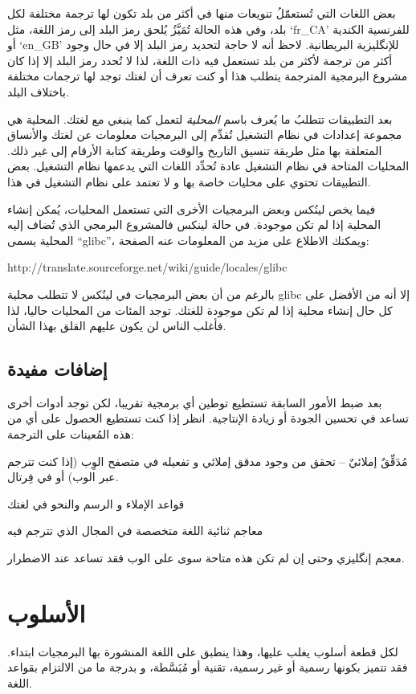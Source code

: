 بعض اللغات التي تُستعمّلُ تنويعات منها في أكثر من بلد تكون لها ترجمة
مختلفة لكل بلد، وفي هذه الحالة تُمَيَّزُ يُلحق رمز البلد إلى رمز اللغة،
مثل ‘fr\_CA’ للفرنسية الكندية أو ‘en\_GB’ للإنگليزية البريطانية. لاحظ
أنه لا حاجة لتحديد رمز البلد إلا في حال وجود أكثر من ترجمة لأكثر من بلد
تستعمل فيه ذات اللغة، لذا لا تُحدد رمز البلد إلا إذا كان مشروع البرمجية
المترجمة يتطلب هذا أو كنت تعرف أن لغتك توجد لها ترجمات مختلفة باختلاف
البلد.

بعد التطبيقات تتطلبُ ما يُعرف باسم {\it المحلية} لتعمل كما ينبغي مع
لغتك. المحلية هي مجموعة إعدادات في نظام التشغيل تُقدِّم إلى البرمجيات
معلومات عن لغتك والأنساق المتعلقة بها مثل طريقة تنسيق التاريخ والوقت
وطريقة كتابة الأرقام إلى غير ذلك. المحليات المتاحة في نظام التشغيل عادة
تُحدِّد اللغات التي يدعمها نظام التشغيل. بعض التطبيقات تحتوي على محليات
خاصة بها و لا تعتمد على نظام التشغيل في هذا.

فيما يخص لينُكس وبعض البرمجيات الأخرى التي تستعمل المحليات، يُمكن إنشاء
المحلية إذا لم تكن موجودة. في حالة لينكس فالمشروع البرمجي الذي تُضاف
إليه المحلية يسمى “glibc”، ويمكنك الاطلاع على مزيد من المعلومات عنه
الصفحة:

http://translate.sourceforge.net/wiki/guide/locales/glibc

بالرغم من أن بعض البرمجيات في لينُكس لا تتطلب محلية glibc إلا أنه من
الأفضل على كل حال إنشاء محلية إذا لم تكن موجودة للغتك. توجد المئات من
المحليات حاليا، لذا فأغلب الناس لن يكون عليهم القلق بهذا الشأن.

\section{إضافات مفيدة}
بعد ضبط الأمور السابقة تستطيع توطين أي برمجية تقريبا، لكن توجد أدوات
أخرى تساعد في تحسين الجودة أو زيادة الإنتاجية. انظر إذا كنت تستطيع
الحصول على أي من هذه المُعينات على الترجمة:

\startitemize[1]
\item مُدَقِّقٌ إملائيٌ – تحقق من وجود مدقق إملائي و تفعيله في متصفح
الوِب (إذا كنت تترجم عبر الوب) أو في فِرتال.
\item قواعد الإملاء و الرسم والنحو في لغتك
\item معاجم ثنائية اللغة متخصصة في المجال الذي تترجم فيه
\item معجم إنگليزي
\stopitemize
وحتى إن لم تكن هذه متاحة سوى على الوب فقد تساعد عند الاضطرار.

\chapter{الأسلوب}
لكل قطعة أسلوب يغلب عليها، وهذا ينطبق على اللغة المنشورة بها البرمجيات
ابتداء. فقد تتميز بكونها رسمية أو غير رسمية، تقنية أو مُبَسَّطة، و
بدرجة ما من الالتزام بقواعد اللغة.


